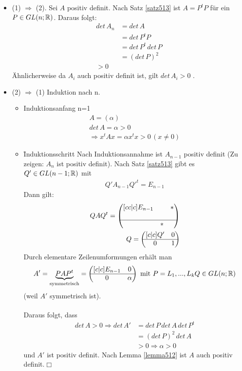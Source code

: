 \begin{itemize}
\item (1) $\Rightarrow$ (2). Sei $A$ positiv definit. Nach Satz \ref{satz513} ist $A = P^t P$ für ein $P \in GL(n; \mathbb{R})$. Daraus folgt:
\begin{align}
det\,A_n &= det\,A \\
&= det\,P^t P \\
&= det\,P^t\, det\,P \\
&= (det\,P)^2 \\
> 0
\end{align}
Ähnlicherweise da $A_i$ auch positiv definit ist, gilt $det\,A_i > 0$ .
\item (2) $\Rightarrow$ (1) Induktion nach n.
\begin{itemize}
\item Induktionsanfang n=1
\begin{align}
A = (\alpha) \\
det\, A = \alpha > 0 \\
\Rightarrow x^t Ax = \alpha x^t x > 0\,(x \neq 0)
\end{align}
\item \f{Induktionsschritt}
Nach Induktionsannahme ist $A_{n-1}$ positiv definit (Zu zeigen: $A_n$ ist positiv definit). Nach Satz \ref{satz513} gibt es $Q' \in GL(n-1; \mathbb{R})$ mit
\begin{align}
Q' A_{n-1} Q'^t = E_{n-1}
\end{align}
Dann gilt:
\begin{align}
QAQ^t = \begin{pmatrix}[cc|c] E_{n-1} & & * \\ & &  \\ \hline & * & \end{pmatrix}\\
Q = \begin{pmatrix}[c|c] Q' & 0 \\ \hline 0 & 1 \end{pmatrix}\\
\end{align}
Durch elementare Zeilenumformungen erhält man
\begin{align}
A' = \underbrace{PAP^t}_{\text{symmetrisch}} = \begin{pmatrix}[c|c] E_{n-1} & 0 \\ \hline 0 & \alpha \end{pmatrix} \text{ mit } P= L_1, ..., L_k Q \in GL(n; \mathbb{R})
\end{align}
(weil $A'$ symmetrisch ist).\\\\
Daraus folgt, dass
\begin{align}
det\,A > 0 \Rightarrow det\, A' &= det\, P\, det\, A\, det\, P^t \\
&= (det\,P)^2 \,det\, A \\
&> 0
\Rightarrow \alpha > 0
\end{align}
und $A'$ ist positiv definit. Nach Lemma \ref{lemma512} ist $A$ auch positiv definit.\hfill $\Box$
\end{itemize}
\end{itemize}

